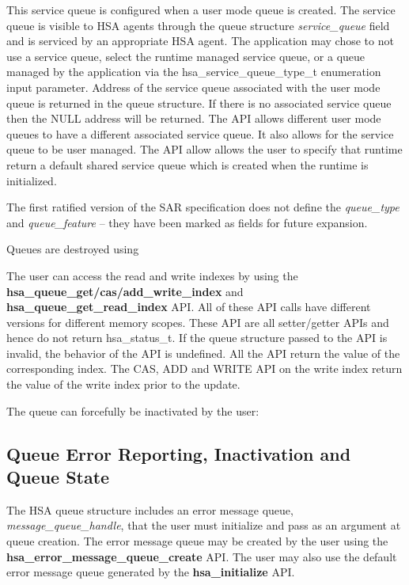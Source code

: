 \documentclass{book}
\newcommand{\reffun}[1]{\textbf{#1}}
\newcommand{\reffld}[1]{\textit{#1}}
\newcommand{\reftyp}[1]{#1}
\begin{document}
This service queue is configured when a user mode queue is created.
The service queue is visible to HSA agents through the queue structure
\reffld{service\_queue} field and is serviced by an appropriate HSA
agent. The application may chose to not use a service queue, select
the runtime managed service queue, or a queue managed by the
application via the \reftyp{hsa\_service\_queue\_type\_t} enumeration
input parameter.  Address of the service queue associated with the
user mode queue is returned in the queue structure. If there is no
associated service queue then the NULL address will be returned.  The
API allows different user mode queues to have a different associated
service queue. It also allows for the service queue to be user
managed. The API allow allows the user to specify that runtime return
a default shared service queue which is created when the runtime is
initialized.

The first ratified version of the SAR specification does not define the
\reffld{queue\_type} and \reffld{queue\_feature} -- they have been
marked as fields for future expansion.

Queues are destroyed using


\vspace{5mm}The user can access the read and write indexes by using
the \reffun{hsa\_queue\_get/cas/add\_write\_index} and
\reffun{hsa\_queue\_get\_read\_index} API. All of these API calls have
different versions for different memory scopes. These API are all
setter/getter APIs and hence do not return \reftyp{hsa\_status\_t}. If
the queue structure passed to the API is invalid, the behavior of the
API is undefined. All the API return the value of the corresponding
index. The CAS, ADD and WRITE API on the write index return the value
of the write index prior to the update.



\vspace{5mm}The queue can forcefully be inactivated by the user:


\hypertarget{queue_errors}{}\subsection{Queue Error Reporting,
Inactivation and Queue State} \label{queueerrors}
The HSA queue structure includes an error message queue, \reffld{message\_queue\_handle}, that the user must initialize and pass as
an argument at queue creation. The error message queue may be
created by the user using the
\reffun{hsa\_error\_message\_queue\_create} API. The user may also
use the default error message queue generated by the
\reffun{hsa\_initialize} API.
\end{document}
